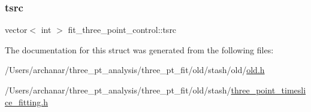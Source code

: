 \mbox{\label{structfit__three__point__control_a7d975f944e1ff4a729248b4a1d74c734}} 
\subsubsection{\texorpdfstring{tsrc}{tsrc}}
{\footnotesize\ttfamily vector$<$ int $>$ fit\+\_\+three\+\_\+point\+\_\+control\+::tsrc}



The documentation for this struct was generated from the following files\+:\begin{DoxyCompactItemize}
\item 
/\+Users/archanar/three\+\_\+pt\+\_\+analysis/three\+\_\+pt\+\_\+fit/old/stash/old/\mbox{\hyperlink{old_8h}{old.\+h}}\item 
/\+Users/archanar/three\+\_\+pt\+\_\+analysis/three\+\_\+pt\+\_\+fit/old/stash/\mbox{\hyperlink{old_2stash_2three__point__timeslice__fitting_8h}{three\+\_\+point\+\_\+timeslice\+\_\+fitting.\+h}}\end{DoxyCompactItemize}
